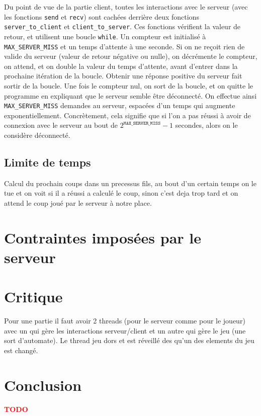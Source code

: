 \documentclass[a4paper]{article}
\newcommand{\TODO}{\textcolor{red}{\textbf{TODO}}}
\begin{document}
Du point de vue de la partie client, toutes les interactions avec le serveur 
(avec les fonctions \texttt{send} et \texttt{recv}) sont cachées derrière deux 
fonctions \texttt{server\_to\_client} et \texttt{client\_to\_server}. Ces 
fonctions vérifient la valeur de retour, et utilisent une boucle 
\texttt{while}. Un compteur est initialisé à \texttt{MAX\_SERVER\_MISS} et un 
temps d'attente à une seconde. Si on ne reçoit rien de valide du serveur 
(valeur de retour négative ou nulle), on décrémente le compteur, on attend, et 
on double la valeur du temps d'attente, avant d'entrer dans la prochaine 
itération de la boucle. Obtenir une réponse positive du serveur fait sortir de 
la boucle. Une fois le compteur nul, on sort de la boucle, et on quitte le 
programme en expliquant que le serveur semble être déconnecté. On effectue 
ainsi \texttt{MAX\_SERVER\_MISS} demandes au serveur, espacées d'un temps qui 
augmente exponentiellement. Concrètement, cela signifie que si l'on a pas 
réussi à avoir de connexion avec le serveur au bout de 
$2^{\texttt{MAX\_SERVER\_MISS}} - 1$ secondes, alors on le considère déconnecté.


\subsection{Limite de temps}

Calcul du prochain coups dans un precessus fils, au bout d'un certain temps on 
le tue et on voit si il a réussi a calculé le coup, sinon c'est deja trop tard 
et on attend le coup joué par le serveur à notre place.


\section{Contraintes imposées par le serveur}



\section{Critique}

Pour une partie il faut avoir 2 threads (pour le serveur comme pour le joueur) 
avec un qui gère les interactions serveur/client et un autre qui gère le jeu 
(une sort d'automate). Le thread jeu dors et est réveillé des qu'un des 
elements du jeu est changé.


\section*{Conclusion}

\TODO


 

\end{document}
